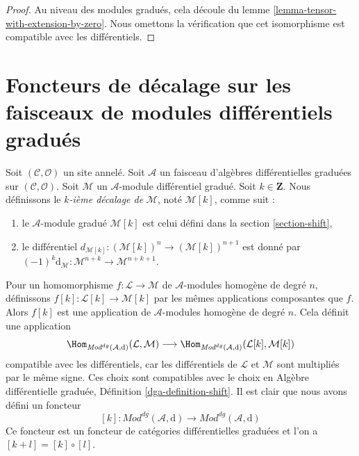 \begin{proof}
Au niveau des modules gradués, cela découle du lemme \ref{lemma-tensor-with-extension-by-zero}.
Nous omettons la vérification que cet isomorphisme est compatible avec les différentiels.
\end{proof}








\section{Foncteurs de décalage sur les faisceaux de modules différentiels gradués}
\label{section-shift-dg}

\noindent
Soit $(\mathcal{C}, \mathcal{O})$ un site annelé.
Soit $\mathcal{A}$ un faisceau d'algèbres différentielles graduées sur $(\mathcal{C}, \mathcal{O})$.
Soit $\mathcal{M}$ un $\mathcal{A}$-module différentiel gradué.
Soit $k \in \mathbf{Z}$.
Nous définissons le {\it $k$-ième décalage de} $\mathcal{M}$, noté $\mathcal{M}[k]$, comme suit :
\begin{enumerate}
\item le $\mathcal{A}$-module gradué $\mathcal{M}[k]$ est celui défini dans la section \ref{section-shift}, \item le différentiel $d_{\mathcal{M}[k]} : (\mathcal{M}[k])^n \to (\mathcal{M}[k])^{n + 1}$ est donné par $(-1)^k\text{d}_\mathcal{M} : \mathcal{M}^{n + k} \to \mathcal{M}^{n + k + 1}$.
\end{enumerate}
Pour un homomorphisme $f : \mathcal{L} \to \mathcal{M}$ de $\mathcal{A}$-modules homogène de degré $n$, définissons $f[k] : \mathcal{L}[k] \to \mathcal{M}[k]$ par les mêmes applications composantes que $f$.
Alors $f[k]$ est une application de $\mathcal{A}$-modules homogène de degré $n$.
Cela définit une application
$$
\Hom_{\textit{Mod}^{dg}(\mathcal{A}, \text{d})}(\mathcal{L}, \mathcal{M})
\longrightarrow
\Hom_{\textit{Mod}^{dg}(\mathcal{A}, \text{d})}
(\mathcal{L}[k], \mathcal{M}[k])
$$
compatible avec les différentiels, car les différentiels de $\mathcal{L}$ et $\mathcal{M}$ sont multipliés par le même signe.
Ces choix sont compatibles avec le choix en Algèbre différentielle graduée, Définition \ref{dga-definition-shift}.
Il est clair que nous avons défini un foncteur
$$
[k] :
\textit{Mod}^{dg}(\mathcal{A}, \text{d})
\longrightarrow
\textit{Mod}^{dg}(\mathcal{A}, \text{d})
$$
Ce foncteur est un foncteur de catégories différentielles graduées et l'on a $[k + l] = [k] \circ [l]$.

